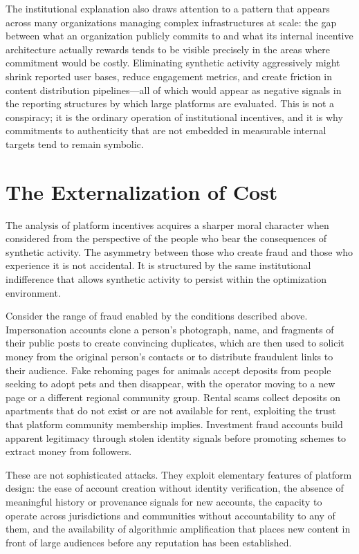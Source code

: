 \documentclass[12pt,a4paper]{article}
\begin{document}
The institutional explanation also draws attention to a pattern that appears across many
organizations managing complex infrastructures at scale: the gap between what an organization
publicly commits to and what its internal incentive architecture actually rewards tends to be
visible precisely in the areas where commitment would be costly. Eliminating synthetic activity
aggressively might shrink reported user bases, reduce engagement metrics, and create friction
in content distribution pipelines---all of which would appear as negative signals in the
reporting structures by which large platforms are evaluated. This is not a conspiracy; it is
the ordinary operation of institutional incentives, and it is why commitments to authenticity
that are not embedded in measurable internal targets tend to remain symbolic.

\section{The Externalization of Cost}

The analysis of platform incentives acquires a sharper moral character when considered from
the perspective of the people who bear the consequences of synthetic activity. The asymmetry
between those who create fraud and those who experience it is not accidental. It is structured
by the same institutional indifference that allows synthetic activity to persist within the
optimization environment.

Consider the range of fraud enabled by the conditions described above. Impersonation accounts
clone a person's photograph, name, and fragments of their public posts to create convincing
duplicates, which are then used to solicit money from the original person's contacts or to
distribute fraudulent links to their audience. Fake rehoming pages for animals accept deposits
from people seeking to adopt pets and then disappear, with the operator moving to a new page
or a different regional community group. Rental scams collect deposits on apartments that do
not exist or are not available for rent, exploiting the trust that platform community membership
implies. Investment fraud accounts build apparent legitimacy through stolen identity signals
before promoting schemes to extract money from followers.

These are not sophisticated attacks. They exploit elementary features of platform design: the
ease of account creation without identity verification, the absence of meaningful history or
provenance signals for new accounts, the capacity to operate across jurisdictions and communities
without accountability to any of them, and the availability of algorithmic amplification that
places new content in front of large audiences before any reputation has been established.
\end{document}
